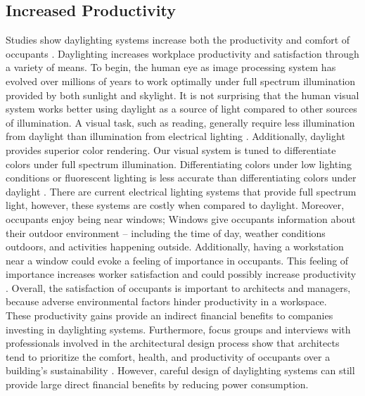 \subsection{Increased Productivity}
Studies show daylighting systems increase both the productivity and comfort of occupants \cite{Menzies}. Daylighting increases workplace productivity and satisfaction through a variety of means. To begin, the human eye as image processing system has evolved over millions of years to work optimally under full spectrum illumination provided by both sunlight and skylight. It is not surprising that the human visual system works better using daylight as a source of light compared to other sources of illumination. A visual task, such as reading, generally require less illumination from daylight than illumination from electrical lighting \cite{Robbins}. Additionally, daylight provides superior color rendering. Our visual system is tuned to differentiate colors under full spectrum illumination. Differentiating colors under low lighting conditions or fluorescent lighting is less accurate than differentiating colors under daylight \cite{Robbins}. There are current electrical lighting systems that provide full spectrum light, however, these systems are costly when compared to daylight. Moreover, occupants enjoy being near windows; Windows give occupants information about their outdoor environment -- including the time of day, weather conditions outdoors, and activities happening outside. Additionally, having a workstation near a window could evoke a feeling of importance in occupants. This feeling of importance increases worker satisfaction and could possibly increase productivity \cite{Leslie}. Overall, the satisfaction of occupants is important to architects and managers, because adverse environmental factors hinder productivity in a workspace.  \\

These productivity gains provide an indirect financial benefits to companies investing in daylighting systems.  Furthermore, focus groups and interviews with professionals involved in the architectural design process show that architects tend to prioritize the comfort, health, and productivity of occupants over a building’s sustainability \cite{Menzies}. However, careful design of daylighting systems can still provide large direct financial benefits by reducing power consumption. \\

